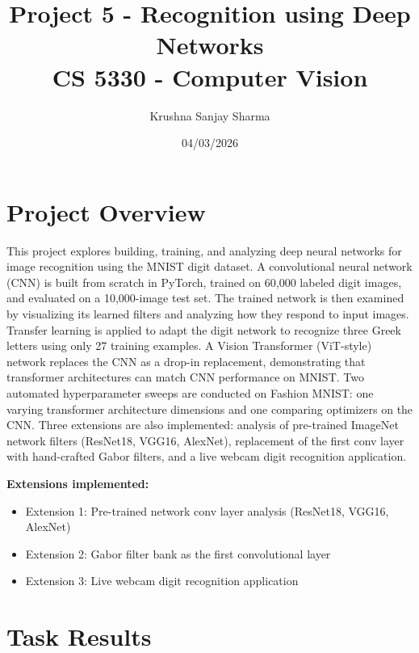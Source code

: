 \documentclass[11pt]{article}
\title{\textbf{Project 5 - Recognition using Deep Networks} \\
       CS 5330 - Computer Vision}
\author{Krushna Sanjay Sharma}
\date{04/03/2026}
\begin{document}
\maketitle
\tableofcontents
\newpage

\section{Project Overview}

This project explores building, training, and analyzing deep neural networks for image recognition using the MNIST digit dataset. A convolutional neural network (CNN) is built from scratch in PyTorch, trained on 60,000 labeled digit images, and evaluated on a 10,000-image test set. The trained network is then examined by visualizing its learned filters and analyzing how they respond to input images. Transfer learning is applied to adapt the digit network to recognize three Greek letters using only 27 training examples. A Vision Transformer (ViT-style) network replaces the CNN as a drop-in replacement, demonstrating that transformer architectures can match CNN performance on MNIST. Two automated hyperparameter sweeps are conducted on Fashion MNIST: one varying transformer architecture dimensions and one comparing optimizers on the CNN. Three extensions are also implemented: analysis of pre-trained ImageNet network filters (ResNet18, VGG16, AlexNet), replacement of the first conv layer with hand-crafted Gabor filters, and a live webcam digit recognition application.

\medskip
\textbf{Extensions implemented:}
\begin{itemize}
    \item Extension 1: Pre-trained network conv layer analysis (ResNet18, VGG16, AlexNet)
    \item Extension 2: Gabor filter bank as the first convolutional layer
    \item Extension 3: Live webcam digit recognition application
\end{itemize}

\newpage

\section{Task Results}
\end{document}
